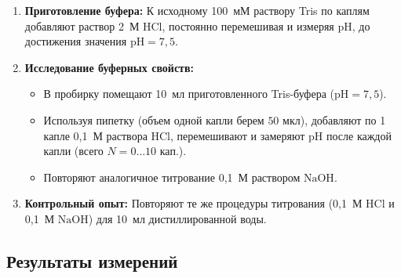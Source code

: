 \documentclass[a4paper,12pt]{article}
\begin{document}
\begin{enumerate}
    \item \textbf{Приготовление буфера:} К исходному 100~мМ раствору Tris по каплям добавляют раствор 2~М $\text{HCl}$, постоянно перемешивая и измеряя $\text{pH}$, до достижения значения $\text{pH} = 7{,}5$.
    \item \textbf{Исследование буферных свойств:}
    \begin{itemize}
        \item В пробирку помещают 10~мл приготовленного Tris-буфера ($\text{pH} = 7{,}5$).
        \item Используя пипетку (объем одной капли берем $ 50$ мкл), добавляют по 1 капле 0,1~М раствора $\text{HCl}$, перемешивают и замеряют $\text{pH}$ после каждой капли (всего $N = 0\dots10$ кап.).
        \item Повторяют аналогичное титрование 0,1~М раствором $\text{NaOH}$.
    \end{itemize}
    \item \textbf{Контрольный опыт:} Повторяют те же процедуры титрования (0,1~М $\text{HCl}$ и 0,1~М $\text{NaOH}$) для 10~мл дистиллированной воды.
\end{enumerate}

\newpage
\subsection*{Результаты измерений}
\end{document}

